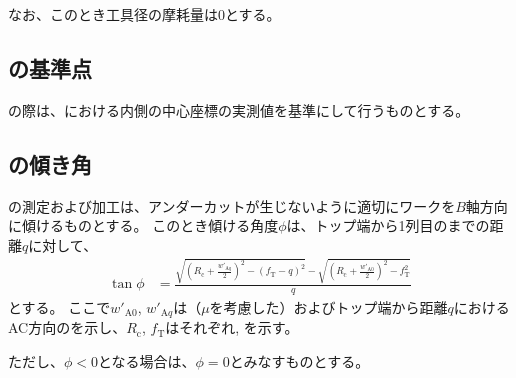 なお、このとき工具径の摩耗量は0とする。


\subsection{\DimpleMilling の基準点}
\DimpleMilling の際は、\TopEndFace における内側の中心座標の実測値を基準にして行うものとする。


\subsection{\DimpleMilling の傾き角}
\Dimple の測定および加工は、アンダーカットが生じないように適切にワークを$B$軸方向に傾けるものとする。
このとき傾ける角度$\phi$は、トップ端から1列目の\nameDimple までの距離$q$に対して、
\begin{align*}
  \tan\phi
  &= \frac{\displaystyle
           \sqrt{\left(R_\mathrm c+\frac{w'_{\mathrm Aq}}2\right)^2-(f_\mathrm T-q)^2}
           -\sqrt{\left(R_\mathrm c+\frac{w'_{\mathrm A0}}2\right)^2-f_\mathrm T^2}}q
\end{align*}
とする。
ここで$w'_{\mathrm A0}$, $w'_{\mathrm Aq}$は（\PlatingThk$\mu$を考慮した）\TopEndACID およびトップ端から距離$q$におけるAC方向の\InnerDiameter を示し、$R_\mathrm c$, $f_\mathrm T$はそれぞれ\CenterCurvatureRadius, \TopAlocationLength を示す。

ただし、$\phi < 0$となる場合は、$\phi = 0$とみなすものとする。
